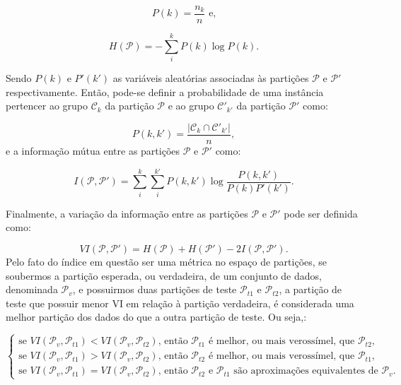 \begin{equation}
P(k) = \frac{n_k}{n}\text{ e,}
\end{equation}

\begin{equation}
H(\mathcal{P}) = -\sum_{i}^{k}P(k) \log P(k).
\end{equation}

Sendo $P(k)$ e $P'(k')$ as variáveis aleatórias associadas às partições $\mathcal{P}$ e $\mathcal{P'}$ respectivamente. Então, pode-se definir a probabilidade de uma instância pertencer ao grupo $\mathcal{C}_k$ da partição $\mathcal{P}$ e ao grupo $\mathcal{C'}_{k'}$ da partição $\mathcal{P'}$ como:

\begin{equation}
P(k,k') = \frac{|\mathcal{C}_k\cap \mathcal{C'}_{k'}|}{n},
\end{equation}
e a informação mútua entre as partições $\mathcal{P}$ e $\mathcal{P'}$ como:

\begin{equation}
I(\mathcal{P},\mathcal{P'}) = \sum_{i}^{k} \sum_{i}^{k'} P(k,k') \log \frac{P(k,k')}{P(k)P'(k')}.
\end{equation}

Finalmente, a variação da informação entre as partições $\mathcal{P}$ e $\mathcal{P'}$ pode ser definida como:

\begin{equation}
VI(\mathcal{P},\mathcal{P'}) = H(\mathcal{P}) + H(\mathcal{P'}) - 2I(\mathcal{P},\mathcal{P'}).
\end{equation}
Pelo fato do índice em questão ser uma métrica no espaço de partições, se soubermos a partição esperada, ou verdadeira, de um conjunto de dados, denominada $\mathcal{P}_v$, e possuirmos duas partições de teste $\mathcal{P}_{t1}$ e $\mathcal{P}_{t2}$, a partição de teste que possuir menor VI em relação à partição verdadeira, é considerada uma melhor partição dos dados do que a outra partição de teste. Ou seja,:

\begin{equation}
\begin{cases}
\text{se } VI(\mathcal{P}_v,\mathcal{P}_{t1})  < VI(\mathcal{P}_v,\mathcal{P}_{t2})\text{, então $\mathcal{P}_{t1}$ é melhor, ou mais verossímel, que $\mathcal{P}_{t2}$} ,\\
\text{se } VI(\mathcal{P}_v,\mathcal{P}_{t1})  > VI(\mathcal{P}_v,\mathcal{P}_{t2})\text{, então $\mathcal{P}_{t2}$ é melhor, ou mais verossímel, que $\mathcal{P}_{t1}$},\\
\text{se } VI(\mathcal{P}_v,\mathcal{P}_{t1})  = VI(\mathcal{P}_v,\mathcal{P}_{t2})\text{, então $\mathcal{P}_{t2}$ e $\mathcal{P}_{t1}$ são aproximações equivalentes de $\mathcal{P}_v$}.
\end{cases}
\end{equation}


